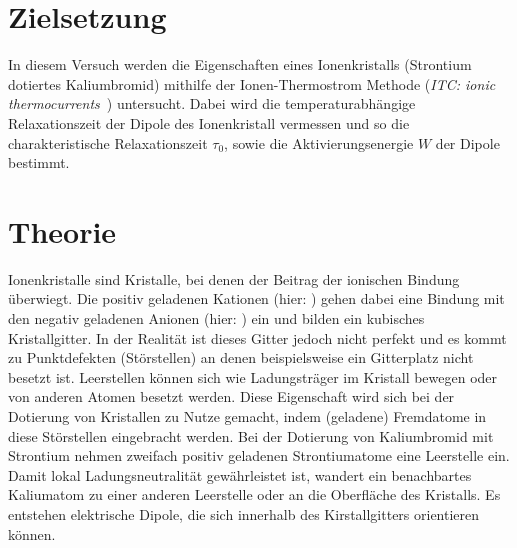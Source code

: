 \section{Zielsetzung}
In diesem Versuch werden die Eigenschaften eines Ionenkristalls (Strontium dotiertes Kaliumbromid) mithilfe der Ionen-Thermostrom Methode
(\textit{ITC: ionic thermocurrents}~\cite{PhysRev.148.816}) untersucht.
Dabei wird die temperaturabhängige Relaxationszeit der Dipole des Ionenkristall vermessen und so die charakteristische Relaxationszeit $\tau_0$, sowie die Aktivierungsenergie $W$
der Dipole bestimmt.

\section{Theorie}
\label{sec:Theorie}
Ionenkristalle sind Kristalle, bei denen der Beitrag der ionischen Bindung überwiegt. Die positiv geladenen Kationen (hier: ) gehen dabei eine Bindung mit den negativ
geladenen Anionen (hier: ) ein und bilden ein kubisches Kristallgitter. In der Realität ist dieses Gitter jedoch nicht perfekt und es kommt zu Punktdefekten (Störstellen)
an denen beispielsweise ein Gitterplatz nicht besetzt ist. Leerstellen können sich wie Ladungsträger im Kristall bewegen oder von anderen Atomen besetzt werden.
Diese Eigenschaft wird sich bei der Dotierung von Kristallen zu Nutze gemacht, indem (geladene) Fremdatome in diese Störstellen eingebracht werden. 
Bei der Dotierung von Kaliumbromid mit Strontium nehmen zweifach positiv geladenen Strontiumatome eine Leerstelle ein. Damit lokal Ladungsneutralität gewährleistet ist,
wandert ein benachbartes Kaliumatom zu einer anderen Leerstelle oder an die Oberfläche des Kristalls.
Es entstehen elektrische Dipole, die sich innerhalb des Kirstallgitters orientieren können.


